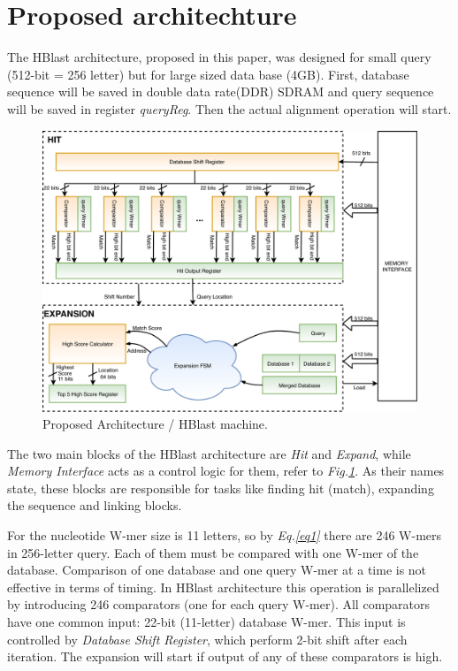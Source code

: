 \section{Proposed architechture}
\label{sec:propesedArch}

\quad The HBlast architecture, proposed in this paper, was designed for small query (512-bit = 256 letter) but for large sized data base (4GB).  First, database sequence will be saved in double data rate(DDR) SDRAM and query sequence will be saved in register \textit{queryReg}. Then the actual alignment operation will start. 
   
\begin{figure}[h!]
\centering
\includegraphics[width=\columnwidth]{Figures/BlastMachine.pdf}
\caption{Proposed Architecture / HBlast machine.} \label{fig:blastArch}
\end{figure}

The two main blocks of the HBlast architecture are \textit{Hit} and \textit{Expand}, while \textit{Memory Interface} acts as a control logic for them, refer to \textit{Fig.\ref{fig:blastArch}}. As their names state, these blocks are responsible for tasks like finding hit (match), expanding the sequence and linking blocks. 

For the nucleotide W-mer size is 11 letters, so by \textit{Eq.\ref{eq1}} there are 246 W-mers in 256-letter query. Each of them must be compared with one W-mer of the database.  Comparison of one database and one query W-mer at a time is not effective in terms of timing. In HBlast architecture this operation is parallelized by introducing 246 comparators (one for each query W-mer). All comparators have one common input: 22-bit (11-letter) database W-mer. This input is controlled by \textit{Database Shift Register}, which perform 2-bit shift after each iteration. The expansion will start if output of any of these comparators is high. 



